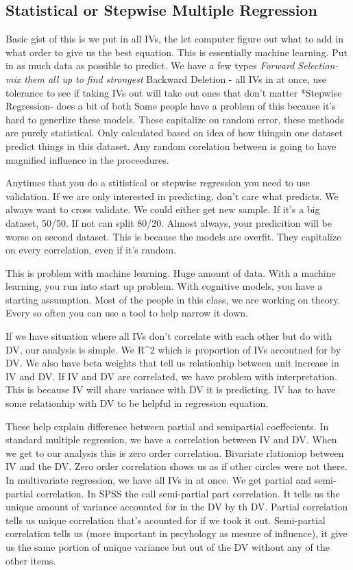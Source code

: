 \documentclass[]{book}
\theoremstyle{definition}
\theoremstyle{definition}
\theoremstyle{definition}
\theoremstyle{remark}
\begin{document}
\subsection{Statistical or Stepwise Multiple
Regression}\label{statistical-or-stepwise-multiple-regression}

Basic gist of this is we put in all IVs, the let computer figure out
what to add in what order to give us the best equation. This is
essentially machine learning. Put in as much data as possible to
predict. We have a few types \emph{Forward Selection-mix them all up to
find strongest }Backward Deletion - all IVs in at once, use tolerance to
see if taking IVs out will take out ones that don't matter *Stepwise
Regression- does a bit of both Some people have a problem of this
because it's hard to generlize these models. These capitalize on random
error, these methods are purely statistical. Only calculated based on
idea of how thingsin one dataset predict things in this dataset. Any
random corelation between is going to have magnified influence in the
proceedures.

Anytimes that you do a stitistical or stepwise regression you need to
use validation. If we are only interested in predicting, don't care what
predicts. We always want to cross validate. We could either get new
sample. If it's a big dataset, 50/50. If not can split 80/20. Almost
always, your predicition will be worse on second dataset. This is
because the models are overfit. They capitalize on every correlation,
even if it's random.

This is problem with machine learning. Huge amount of data. With a
machine learning, you run into start up problem. With cognitive models,
you have a starting assumption. Most of the people in this class, we are
working on theory. Every so often you can use a tool to help narrow it
down.

If we have situation where all IVs don't correlate with each other but
do with DV, our analysis is simple. We R\^{}2 which is proportion of IVs
accoutned for by DV. We also have beta weights that tell us relationhip
between unit increase in IV and DV. If IV and DV are correlated, we have
problem with interpretation. This is because IV will share variance with
DV it is predicting. IV has to have some relationhip with DV to be
helpful in regression equation.

These help explain difference between partial and semipartial
coeffecients. In standard multiple regression, we have a correlation
between IV and DV. When we get to our analysis this is zero order
correlation. Bivariate rlationiop between IV and the DV. Zero order
correlation shows us as if other circles were not there. In multivariate
regression, we have all IVs in at once. We get partial and semi-partial
correlation. In SPSS the call semi-partial part correlation. It tells us
the unique amount of variance accounted for in the DV by th DV. Partial
correlation tells us unique correlation that's acounted for if we took
it out. Semi-partial correlation tells us (more important in pscyhology
as mesure of influence), it give us the same portion of unique variance
but out of the DV without any of the other items.
\end{document}
